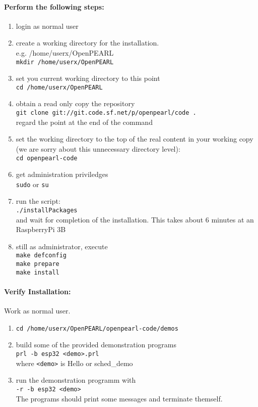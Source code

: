 \documentclass[oneside,10pt]{scrbook}
\begin{document}
\paragraph{Perform the following steps:}
\begin{enumerate}
\item login as normal user
\item create a working directory for the installation. \\
   e.g. /home/userx/OpenPEARL\\
    \verb|mkdir /home/userx/OpenPEARL|
\item set you current working directory to this point \\
    \verb|cd /home/userx/OpenPEARL|
\item obtain a read only copy the repository\\
    \verb|git clone git://git.code.sf.net/p/openpearl/code .|\\
    regard the point at the end of the command
\item set the working directory to the top of the real content
     in your working copy 
     (we are sorry about this unnecessary directory level): \\
    \verb|cd openpearl-code|
\item get administration priviledges\\
    \verb|sudo| or \verb|su|
\item run the script:\\
    \verb|./installPackages|\\
    and wait for completion of the installation.
    This takes about 6 minutes at an RaspberryPi 3B
\item still as administrator, execute\\
    \verb|make defconfig|\\
    \verb|make prepare|\\
    \verb|make install|\\
\end{enumerate}

\paragraph{Verify Installation:}
Work as normal user.


\begin{enumerate}
\item \verb|cd /home/userx/OpenPEARL/openpearl-code/demos|
\item build some of the provided demonstration programs\\
   \verb|prl -b esp32 <demo>.prl|\\
   where \verb|<demo>| is Hello or sched\_demo
\item run the demonstration programm with \\
   \verb|-r -b esp32 <demo> |\\
   The programs should print some messages and terminate themself.
\end{enumerate}
\end{document}
